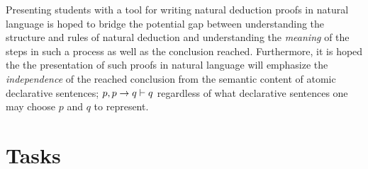 \documentclass[a4paper]{article}
\begin{document}
    Presenting students with a tool for writing natural deduction proofs
    in natural language is hoped to bridge the potential gap between
    understanding the structure and rules of natural deduction and
    understanding the \emph{meaning} of the steps in such a process as well
    as the conclusion reached. Furthermore, it is hoped the the
    presentation of such proofs in natural language will emphasize the
    \emph{independence} of the reached conclusion from the semantic 
    content of atomic declarative sentences; \(p, p \rightarrow q \vdash q\)
    regardless
    of what declarative sentences one may choose $p$ and $q$ to represent.

\section{Tasks}
\end{document}
